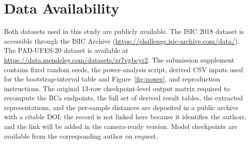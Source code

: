 \section*{Data Availability}

Both datasets used in this study are publicly available. The ISIC 2018 dataset is accessible through the ISIC Archive (\url{https://challenge.isic-archive.com/data/}). The PAD-UFES-20 dataset is available at \url{https://data.mendeley.com/datasets/zr7vgbcyr2}. The submission supplement contains fixed random seeds, the power-analysis script, derived CSV inputs used for the bootstrap-interval table and Figure~\ref{fig:power}, and reproduction instructions. The original 13-row checkpoint-level output matrix required to recompute the BCa endpoints, the full set of derived result tables, the extracted representations, and the per-sample distances are deposited in a public archive with a citable DOI; the record is not linked here because it identifies the authors, and the link will be added in the camera-ready version. Model checkpoints are available from the corresponding author on request.
